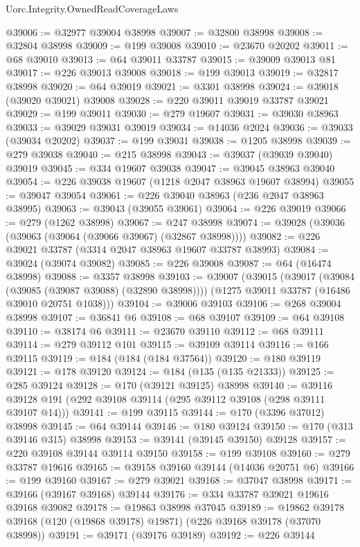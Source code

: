 \begin{lexlean}{Uorc.Integrity.OwnedReadCoverageLaws}
\begin{coremodule}
@39006 := @32977 @39004 @38998
@39007 := @32800 @38998
@39008 := @32804 @38998
@39009 := @199 @39008
@39010 := @23670 @20202
@39011 := @68 @39010
@39013 := @64 @39011 @33787
@39015 := @39009 @39013 @81
@39017 := @226 @39013 @39008
@39018 := @199 @39013
@39019 := @32817 @38998
@39020 := @64 @39019
@39021 := @3301 @38998
@39024 := @39018 (@39020 @39021) @39008
@39028 := @220 @39011 @39019 @33787 @39021
@39029 := @199 @39011
@39030 := @279 @19607
@39031 := @39030 @38963
@39033 := @39029 @39031 @39019
@39034 := @14036 @2024
@39036 := @39033 (@39034 @20202)
@39037 := @199 @39031
@39038 := @1205 @38998
@39039 := @279 @39038
@39040 := @215 @38998
@39043 := @39037 (@39039 @39040) @39019
@39045 := @334 @19607 @39038
@39047 := @39045 @38963 @39040
@39054 := @226 @39038 @19607 (@1218 @2047 @38963 @19607 @38994)
@39055 := @39047 @39054
@39061 := @226 @39040 @38963 (@236 @2047 @38963 @38995)
@39063 := @39043 (@39055 @39061)
@39064 := @226 @39019
@39066 := @279 (@1262 @38998)
@39067 := @247 @38998
@39074 := @39028 (@39036 (@39063 (@39064 (@39066 @39067) (@32867 @38998))))
@39082 := @226 @39021 @33787 (@3314 @2047 @38963 @19607 @33787 @38993)
@39084 := @39024 (@39074 @39082)
@39085 := @226 @39008
@39087 := @64 (@16474 @38998)
@39088 := @3357 @38998
@39103 := @39007
    (@39015
      (@39017 (@39084 (@39085 (@39087 @39088) (@32890 @38998))))
      (@1275 @39011 @33787 (@16486 @39010 @20751 @1038)))
@39104 := @39006 @39103
@39106 := @268 @39004 @38998
@39107 := @36841 @6
@39108 := @68 @39107
@39109 := @64 @39108
@39110 := @38174 @6
@39111 := @23670 @39110
@39112 := @68 @39111
@39114 := @279 @39112 @101
@39115 := @39109 @39114
@39116 := @166 @39115
@39119 := @184 (@184 (@184 @37564))
@39120 := @180 @39119
@39121 := @178 @39120
@39124 := @184 (@135 (@135 @21333))
@39125 := @285 @39124
@39128 := @170 (@39121 @39125) @38998
@39140 := @39116 @39128 @191 (@292 @39108 @39114 (@295 @39112 @39108 (@298 @39111 @39107 @14)))
@39141 := @199 @39115
@39144 := @170 (@3396 @37012) @38998
@39145 := @64 @39144
@39146 := @180 @39124
@39150 := @170 (@313 @39146 @315) @38998
@39153 := @39141 (@39145 @39150) @39128
@39157 := @220 @39108 @39144 @39114 @39150
@39158 := @199 @39108
@39160 := @279 @33787 @19616
@39165 := @39158 @39160 @39144 (@14036 @20751 @6)
@39166 := @199 @39160
@39167 := @279 @39021
@39168 := @37047 @38998
@39171 := @39166 (@39167 @39168) @39144
@39176 := @334 @33787 @39021 @19616 @39168 @39082
@39178 := @19863 @38998 @37045
@39189 := @19862 @39178 @39168 (@120 (@19868 @39178) @19871) (@226 @39168 @39178 (@37070 @38998))
@39191 := @39171 (@39176 @39189)
@39192 := @226 @39144

\end{coremodule}
\end{lexlean}
